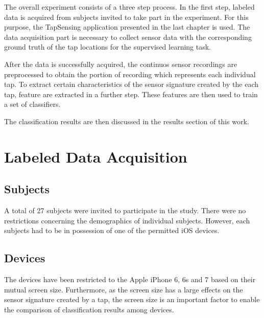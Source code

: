 The overall experiment consists of a three step process. In the first step, labeled data is acquired from subjects invited to take part in the experiment. For this purpose, the TapSensing application presented in the last chapter is used. The data acquisition part is necessary to collect sensor data with the corresponding ground truth of the tap locations for the supervised learning task. 

After the data is successfully acquired, the continuos sensor recordings are preprocessed to obtain the portion of recording which represents each individual tap. To extract certain characteristics of the sensor signature created by the each tap, feature are extracted in a further step. These features are then used to train a set of classifiers. 

The classification results are then discussed in the results section of this work.



\section{Labeled Data Acquisition}

\subsection{Subjects}
A total of 27 subjects were invited to participate in the study. There were no restrictions concerning the demographics of individual subjects. However, each subjects had to be in  possession of one of the permitted iOS devices.

\subsection{Devices}
The devices have been restricted to the Apple iPhone 6, 6s and 7 based on their mutual screen size. Furthermore, as the screen size has a large effects on the sensor signature created by a tap, the screen size is an important factor to enable the comparison of classification results among devices.

